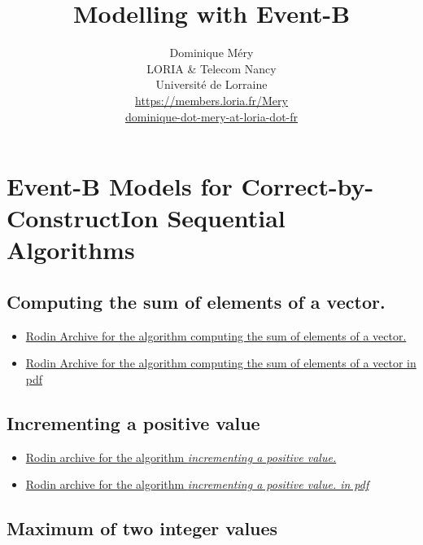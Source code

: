 \documentclass[ 12pt]{article}
\title{Modelling with Event-B}
\author{Dominique M\'ery\\
LORIA \& Telecom Nancy\\ Universit\'e de Lorraine\\
\url{https://members.loria.fr/Mery}\\ \url{dominique-dot-mery-at-loria-dot-fr}}
\begin{document}
  \setcounter{ex}{1}
\maketitle



\section{Event-B Models  for Correct-by-ConstructIon Sequential Algorithms}
\label{sec:last-news}

\subsection{ Computing the sum of elements of a vector.}
\label{sec:comp-sum-elem}


\begin{itemize}
\item[] 
  \href{https://mery54.github.io/mery/eventb/ex3.zip}{Rodin Archive 
    for  the algorithm  computing the sum of elements of a vector.}
\item   \href{https://mery54.github.io/mery/eventb/ex3.pdf}{Rodin Archive 
    for  the algorithm  computing the sum of elements of a vector in
    pdf }

\end{itemize}



\subsection{Incrementing a positive value}
\label{sec:comp-sum-elem}


\begin{itemize}
\item[] 
  \href{https://mery54.github.io/mery/eventb/ex1.zip}{Rodin archive 
    for the algorithm \textit{ incrementing a positive value.}}

 \item[] 
  \href{https://mery54.github.io/mery/eventb/ex1.pdf}{Rodin archive 
        for the algorithm \textit{ incrementing a positive value. in pdf}} 
    
\end{itemize}



\subsection{Maximum of two integer values}
\label{sec:comp-sum-elem}
\end{document}
